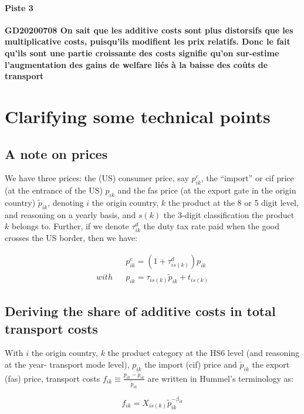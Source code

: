 \documentclass[a4paper,12pt]{article}
\begin{document}
\paragraph{Piste 3} \textbf{GD20200708 On sait que les additive costs sont plus distorsifs que les multiplicative costs, puisqu’ils modifient les prix relatifs. Donc le fait qu’ils sont une partie croissante des costs signifie qu’on sur-estime l’augmentation des gains de welfare liés à la baisse des coûts de transport}

\appendix


\section{Clarifying some technical points \label{app:technical_points}}


\subsection{A note on prices}

We have three prices: the (US) consumer price, say $p^{c}_{ik}$, the ``import'' or  cif price (at the entrance of the US) $p_{ik}$ and the fas price (at the export gate in the origin country) $\widetilde{p}_{ik}$, denoting $i$ the origin country, $k$ the product at the 8 or 5 digit level, and reasoning on a yearly basis, and $s(k)$ the 3-digit classification the product $k$ belongs to. Further, if we denote $\tau^d_{ik}$ the duty tax rate paid when the good crosses the US border, then we have:

\begin{eqnarray*}
&&p^c_{ik} = (1+\tau^d_{is(k)})p_{ik} \\
with && p_{ik}  = \tau_{is(k)} \widetilde{p}_{ik} +t_{is(k)}
\end{eqnarray*}


\subsection{Deriving the share of additive costs in total transport costs \label{app:interpret_beta}}


With $i$ the origin country, $k$ the product category at the HS6 level (and reasoning at the year- transport mode level), $p_{ik}$ the import (cif) price and $\tilde{p}_{ik}$ the export (fas) price, transport costs $f_{ik}\equiv \frac{p_{ik}- \tilde{p}_{ik}}{\tilde{p}_{ik}} $ are written in Hummel's terminology as:


\begin{equation}
f_{ik} = X_{is(k)}\tilde{p}_{ik}^{-\beta_{ik}} \label{eq:Hummels}
\end{equation}
\end{document}
